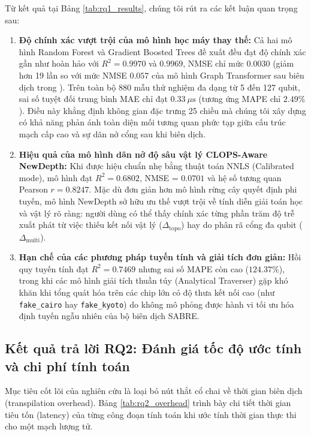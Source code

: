 \documentclass[11pt, a4paper]{article}
\begin{document}
Từ kết quả tại Bảng \ref{tab:rq1_results}, chúng tôi rút ra các kết luận quan trọng sau:
\begin{enumerate}
    \item \textbf{Độ chính xác vượt trội của mô hình học máy thay thế:} Cả hai mô hình Random Forest và Gradient Boosted Trees đề xuất đều đạt độ chính xác gần như hoàn hảo với $R^2 = 0.9970$ và $0.9969$, NMSE chỉ mức $0.0030$ (giảm hơn 19 lần so với mức NMSE $0.057$ của mô hình Graph Transformer sau biên dịch trong \cite{ma2025understanding}). Trên toàn bộ 880 mẫu thử nghiệm đa dạng từ 5 đến 127 qubit, sai số tuyệt đối trung bình MAE chỉ đạt $0.33~\mu\text{s}$ (tương ứng MAPE chỉ $2.49\%$). Điều này khẳng định không gian đặc trưng 25 chiều mà chúng tôi xây dựng có khả năng phản ánh toàn diện mối tương quan phức tạp giữa cấu trúc mạch cấp cao và sự dãn nở cổng sau khi biên dịch.
    \item \textbf{Hiệu quả của mô hình dãn nở độ sâu vật lý CLOPS-Aware NewDepth:} Khi được hiệu chuẩn nhẹ bằng thuật toán NNLS (Calibrated mode), mô hình đạt $R^2 = 0.6802$, NMSE = $0.0701$ và hệ số tương quan Pearson $r = 0.8247$. Mặc dù đơn giản hơn mô hình rừng cây quyết định phi tuyến, mô hình NewDepth sở hữu ưu thế vượt trội về tính diễn giải toán học và vật lý rõ ràng: người dùng có thể thấy chính xác từng phần trăm độ trễ xuất phát từ việc thiếu kết nối vật lý ($\Delta_{\text{topo}}$) hay do phân rã cổng đa qubit ($\Delta_{\text{multi}}$).
    \item \textbf{Hạn chế của các phương pháp tuyến tính và giải tích đơn giản:} Hồi quy tuyến tính đạt $R^2 = 0.7469$ nhưng sai số MAPE còn cao ($124.37\%$), trong khi các mô hình giải tích thuần túy (Analytical Traverser) gặp khó khăn khi tổng quát hóa trên các chip lớn có độ thưa kết nối cao (như \texttt{fake\_cairo} hay \texttt{fake\_kyoto}) do không mô phỏng được hành vi tối ưu hóa định tuyến ngẫu nhiên của bộ biên dịch SABRE.
\end{enumerate}

\subsection{Kết quả trả lời RQ2: Đánh giá tốc độ ước tính và chi phí tính toán}
Mục tiêu cốt lõi của nghiên cứu là loại bỏ nút thắt cổ chai về thời gian biên dịch (transpilation overhead). Bảng \ref{tab:rq2_overhead} trình bày chi tiết thời gian tiêu tốn (latency) của từng công đoạn tính toán khi ước tính thời gian thực thi cho một mạch lượng tử.
\end{document}
